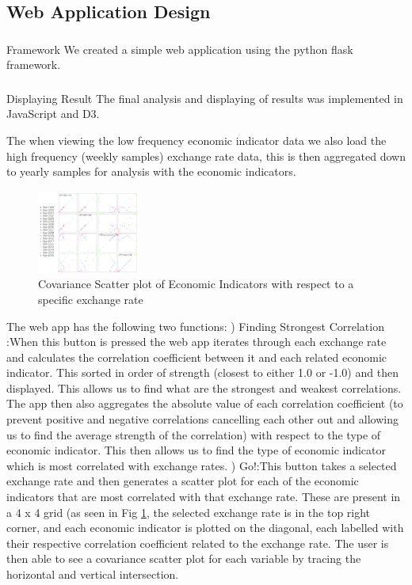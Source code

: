 \subsection{Web Application Design}
\subsubsection{}{Framework}
We created a simple web application using the python flask framework.
\subsubsection{}{Displaying Result}
The final analysis and displaying of results was implemented in JavaScript and D3.  

The when viewing the low frequency economic indicator data we also load the high frequency (weekly samples) exchange rate data, this is then aggregated down to yearly samples for analysis with the economic indicators.
\newline
 
\begin{figure}[!h]
	\begin{center}
		\includegraphics[width=0.30\textwidth]{web.jpg}
		\caption{Covariance Scatter plot of Economic Indicators with respect to a specific exchange rate}
		\label{scatter_plot}
	\end{center}
\end{figure}

The web app has the following two functions:
)	Finding Strongest Correlation :When this button is pressed the web app iterates through each exchange rate and calculates the correlation coefficient between it and each related economic indicator.  This sorted in order of strength (closest to either 1.0 or -1.0) and then displayed.  This allows us to find what are the strongest and weakest correlations. The app then also aggregates the absolute value of each correlation coefficient (to prevent positive and negative correlations cancelling each other out and allowing us to find the average strength of the correlation) with respect to the type of economic indicator.  This then allows us to find the type of economic indicator which is most correlated with exchange rates.
)	Go!:This button takes a selected exchange rate and then generates a scatter plot for each of the economic indicators that are most correlated with that exchange rate. These are present in a 4 x 4 grid (as seen in Fig \ref{scatter_plot}, the selected exchange rate is in the top right corner, and each economic indicator is plotted on the diagonal, each labelled with their respective correlation coefficient related to the exchange rate.  The user is then able to see a covariance scatter plot for each variable by tracing the horizontal and vertical intersection.

